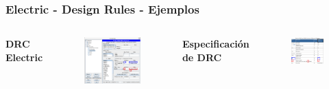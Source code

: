 \documentclass{beamer}
\begin{document}
\begin{frame}
\frametitle{Electric - Design Rules - Ejemplos}
\begin{columns}[t] %
\textbf{DRC Electric}
\begin{figure}
\includegraphics[width=0.99\linewidth]{figuras/configuracionElectric-8b.png}
\end{figure}
\textbf{Especificación de DRC}
\begin{figure}
\includegraphics[width=0.99\linewidth]{figuras/configuracionElectric-9.png}
\end{figure}
\end{columns}
\end{frame}
\end{document}
